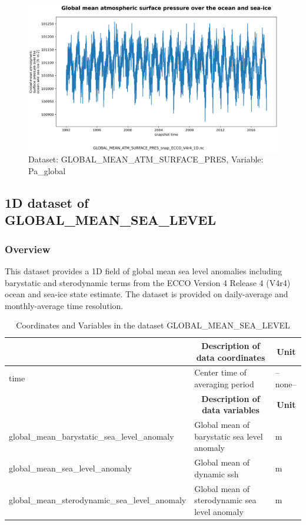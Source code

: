 \begin{figure}[H]
\centering
\includegraphics[scale=0.55]{../images/plots/v4r4/oneD_plots/Global_Mean_Atmospheric_Pressure/Pa_global.png}
\caption{Dataset: GLOBAL\_MEAN\_ATM\_SURFACE\_PRES, Variable: Pa\_global}
\label{tab:table-GLOBAL_MEAN_ATM_SURFACE_PRES_Pa_global-Plot}
\end{figure}
\newpage
\subsection{1D dataset of GLOBAL\_MEAN\_SEA\_LEVEL}
\newp
\subsubsection{Overview}
This dataset provides a 1D field of global mean sea level anomalies including barystatic and sterodynamic terms from the ECCO Version 4 Release 4 (V4r4) ocean and sea-ice state estimate. The dataset is provided on daily-average and monthly-average time resolution. 
\begin{longtable}{|m{}|m{}|m{}|}
\caption{Coordinates and Variables in the dataset GLOBAL\_MEAN\_SEA\_LEVEL}
\label{tab:table-GLOBAL_MEAN_SEA_LEVEL-fields} \\ 
\hline \endhead \hline \endfoot
\rowcolor{lightgray} \multicolumn{1}{|c|}{\textbf{Coordinates}} & \multicolumn{1}{|c|}{\textbf{Description of data coordinates}} &  \multicolumn{1}{|c|}{\textbf{Unit}}\\ \hline
time &Center time of averaging period &--none--  \\ \hline
\rowcolor{lightgray} \multicolumn{1}{|c|}{\textbf{Variables}} & \multicolumn{1}{|c|}{\textbf{Description of data variables}} &  \multicolumn{1}{|c|}{\textbf{Unit}}\\ \hline
global\_mean\_barystatic\_sea\_level\_anomaly &Global mean of barystatic sea level anomaly &m  \\ \hline
global\_mean\_sea\_level\_anomaly &Global mean of dynamic ssh &m  \\ \hline
global\_mean\_sterodynamic\_sea\_level\_anomaly &Global mean of sterodynamic sea level anomaly &m  \\ \hline
\end{longtable}

